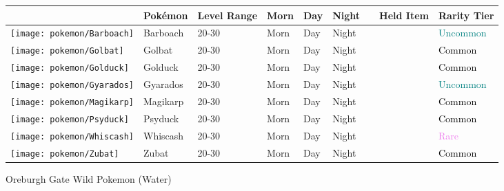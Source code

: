 \begin{longtable}{||l l l l l l l l l||}%
\hline%
&Pokémon&Level Range&Morn&Day&Night&&Held Item&Rarity Tier\\%
\hline%
\endhead%
\hline%
\texttt{[image: pokemon/Barboach]}&Barboach&20{-}30&Morn&Day&Night&&&\textcolor{teal}{%
Uncommon%
}\\%
\hline%
\texttt{[image: pokemon/Golbat]}&Golbat&20{-}30&Morn&Day&Night&&&\textcolor{black}{%
Common%
}\\%
\hline%
\texttt{[image: pokemon/Golduck]}&Golduck&20{-}30&Morn&Day&Night&&&\textcolor{black}{%
Common%
}\\%
\hline%
\texttt{[image: pokemon/Gyarados]}&Gyarados&20{-}30&Morn&Day&Night&&&\textcolor{teal}{%
Uncommon%
}\\%
\hline%
\texttt{[image: pokemon/Magikarp]}&Magikarp&20{-}30&Morn&Day&Night&&&\textcolor{black}{%
Common%
}\\%
\hline%
\texttt{[image: pokemon/Psyduck]}&Psyduck&20{-}30&Morn&Day&Night&&&\textcolor{black}{%
Common%
}\\%
\hline%
\texttt{[image: pokemon/Whiscash]}&Whiscash&20{-}30&Morn&Day&Night&&&\textcolor{violet}{%
Rare%
}\\%
\hline%
\texttt{[image: pokemon/Zubat]}&Zubat&20{-}30&Morn&Day&Night&&&\textcolor{black}{%
Common%
}\\%
\hline%
\end{longtable}%
\caption{Oreburgh Gate Wild Pokemon (Water)}